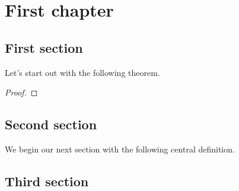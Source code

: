 \chapter{First chapter}
%
%
\section{First section}
%
Let's start out with the following theorem.
%
\begin{theorem}
    \label{th:logicalgebra}
    \lipsum[1]
\end{theorem}
\begin{proof}
    \lipsum[1]
\end{proof}

\section{Second section}

We begin our next section with the following central definition.

\begin{definition}
    \label{th:rationalcauchysequence}
    \lipsum[1]
\end{definition}

\begin{note}
    \lipsum[1]
\end{note}

\begin{example}[Solving the equation $x^2 = 2$]
    \lipsum[1]
\end{example}

\section{Third section}

